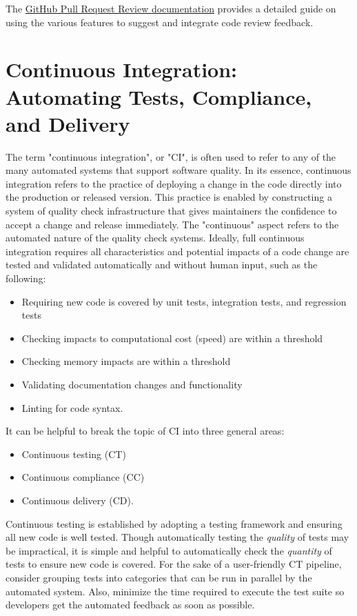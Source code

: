 \documentclass[]{nlr}
\begin{document}
The \href{https://docs.github.com/en/pull-requests/collaborating-with-pull-requests/reviewing-changes-in-pull-requests/incorporating-feedback-in-your-pull-request}{GitHub Pull Request Review documentation}
provides a detailed guide on using the various features to suggest and integrate
code review feedback.


\section{Continuous Integration: Automating Tests, Compliance, and Delivery}
\label{sec:continuous}

The term "continuous integration", or "CI", is often used to refer to any of the many
automated systems that support software quality.
In its essence, continuous integration refers to the practice of deploying a change in
the code directly into the production or released version.
This practice is enabled by constructing a system of quality check infrastructure that gives
maintainers the confidence to accept a change and release immediately.
The "continuous" aspect refers to the automated nature of the quality check systems.
Ideally, full continuous integration requires all characteristics and potential
impacts of a code change are tested and validated automatically and without human
input, such as the following:
\begin{itemize}
\item Requiring new code is covered by unit tests, integration tests, and regression tests
\item Checking impacts to computational cost (speed) are within a threshold
\item Checking memory impacts are within a threshold
\item Validating documentation changes and functionality
\item Linting for code syntax.
\end{itemize}

It can be helpful to break the topic of CI into three general areas:
\begin{itemize}
\item Continuous testing (CT)
\item Continuous compliance (CC)
\item Continuous delivery (CD).
\end{itemize}

Continuous testing is established by adopting a testing framework and ensuring all
new code is well tested. Though automatically testing the \textit{quality} of tests may be impractical,
it is simple and helpful to automatically check the \textit{quantity} of tests to ensure new
code is covered.
For the sake of a user-friendly CT pipeline, consider grouping tests into categories
that can be run in parallel by the automated system.
Also, minimize the time required to execute the test suite so developers get
the automated feedback as soon as possible.
\end{document}

